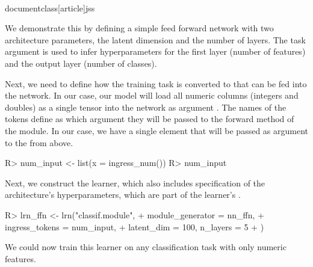 \\documentclass[article]{jss}
\theoremstyle{definition}
\begin{document}
We demonstrate this by defining a simple feed forward network with two architecture parameters, the latent dimension and the number of layers.
The task argument is used to infer hyperparameters for the first layer (number of features) and the output layer (number of classes).


Next, we need to define how the training task is converted to  that can be fed into the network.
In our case, our model will load all numeric columns (integers and doubles) as a single tensor into the network as argument .
The names of the tokens define as which argument they will be passed to the forward method of the module.
In our case, we have a single element  that will be passed as argument  to the  from above.

\begin{CodeInput}
R> num_input <- list(x = ingress_num())
R> num_input
\end{CodeInput}


Next, we construct the learner, which also includes specification of the architecture's hyperparameters, which are part of the learner's .

\begin{CodeInput}
R> lrn_ffn <- lrn("classif.module",
+    module_generator = nn_ffn,
+    ingress_tokens = num_input,
+    latent_dim = 100, n_layers = 5
+  )
\end{CodeInput}

We could now train this learner on any \mlrt{} classification task with only numeric features.
\end{document}
